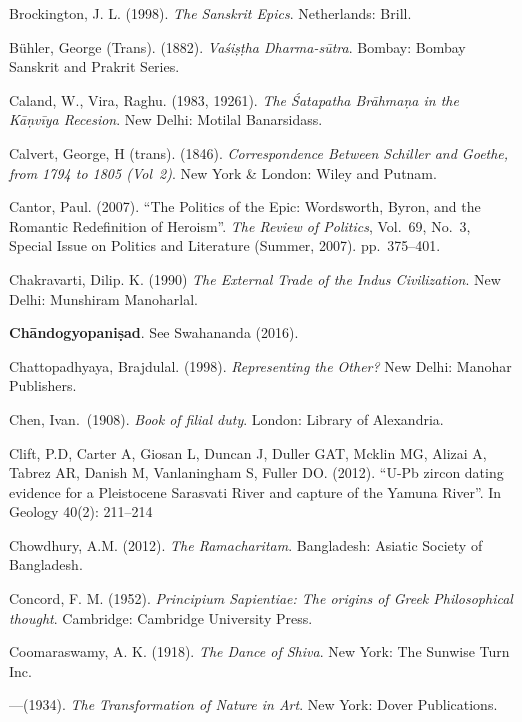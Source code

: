 \begin{thebibliography}{99}
Brockington, J. L. (1998). {\sl The Sanskrit Epics}. Netherlands: Brill.

Bühler, George (Trans). (1882). {\sl Vaśiṣṭha Dharma-sūtra}. Bombay: Bombay Sanskrit and Prakrit Series. 

Caland, W., Vira, Raghu. (1983, 19261). {\sl The Śatapatha Brāhmaṇa in the Kāṇvīya Recesion}. New Delhi: Motilal Banarsidass. 

Calvert, George, H (trans). (1846). {\sl Correspondence Between Schiller and Goethe, from 1794 to 1805 (Vol~2)}. New York \& London: Wiley and Putnam.  

Cantor, Paul. (2007). “The Politics of the Epic: Wordsworth, Byron, and the Romantic Redefinition of Heroism”. {\sl The Review of Politics}, Vol.~69, No.~3, Special Issue on Politics and Literature (Summer, 2007). pp.~375--401.

Chakravarti, Dilip. K. (1990) {\sl The External Trade of the Indus Civilization}. New Delhi: Munshiram Manoharlal. 

{\bf Chāndogyopaniṣad}. See Swahananda (2016).

Chattopadhyaya, Brajdulal. (1998). {\sl Representing the Other?} New Delhi: Manohar Publishers. 

Chen, Ivan.\ (1908). {\sl Book of filial duty}. London: Library of Alexandria. 

Clift, P.D, Carter A, Giosan L, Duncan J, Duller GAT, Mcklin MG, Alizai A, Tabrez AR, Danish M, Vanlaningham S, Fuller DO. (2012). “U-Pb zircon dating evidence for a Pleistocene Sarasvati River and capture of the Yamuna River”. In Geology 40(2): 211--214

Chowdhury, A.M. (2012). {\sl The Ramacharitam}. Bangladesh: Asiatic Society of Bangladesh. 

Concord, F. M. (1952). {\sl Principium Sapientiae: The origins of Greek Philosophical thought}. Cambridge: Cambridge University Press. 

Coomaraswamy, A. K. (1918). {\sl The Dance of Shiva}. New York: The Sunwise Turn Inc. 

---\kern3pt(1934). {\sl The Transformation of Nature in Art}. New York: Dover Publications.


\end{thebibliography}
